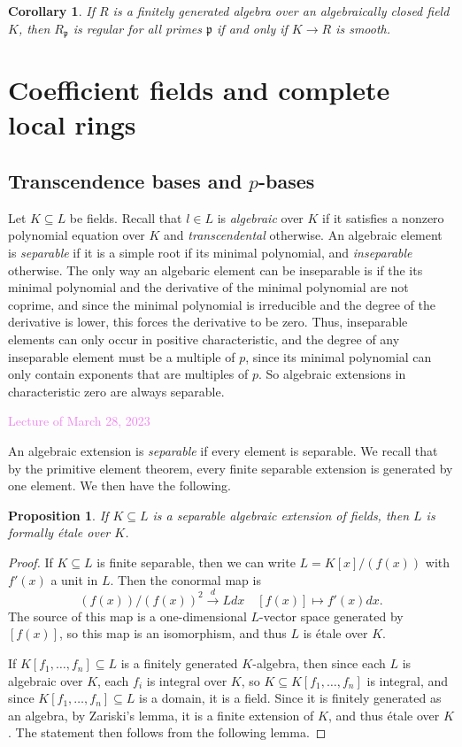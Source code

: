 \documentclass{amsart}[12pt]
\newcommand{\Mar}[1]{\textcolor{violet}{Lecture of March #1, 2023}}
\newcommand{\fp}{{\mathfrak p}}
\numberwithin{equation}{section}
\theoremstyle{plain} %
\newtheorem{cor}[equation]{Corollary}
\newtheorem{prop}[equation]{Proposition}
\theoremstyle{definition}
\theoremstyle{remark}
\newcommand{\xra}[1]{\xrightarrow{#1}}
\begin{document}
\begin{cor} If $R$ is a finitely generated algebra over an algebraically closed field $K$, then $R_\fp$ is regular for all primes $\fp$ if and only if $K\to R$ is smooth.
\end{cor}

\section{Coefficient fields and complete local rings}

\subsection{Transcendence bases and $p$-bases}

Let $K\subseteq L$ be fields. Recall that $l\in L$ is \emph{algebraic} over $K$ if it satisfies a nonzero polynomial equation over $K$ and \emph{transcendental} otherwise. An algebraic element is \emph{separable} if it is a simple root if its minimal polynomial, and \emph{inseparable} otherwise. The only way an algebaric element can be inseparable is if the  its minimal polynomial and the derivative of the minimal polynomial are not coprime, and since the minimal polynomial is irreducible and the degree of the derivative is lower, this forces the derivative to be zero. Thus, inseparable elements can only occur in positive characteristic, and the degree of any inseparable element must be a multiple of $p$, since its minimal polynomial can only contain exponents that are multiples of $p$. So algebraic extensions in characteristic zero are always separable.

\Mar{28}

An algebraic extension is \emph{separable} if every element is separable. We recall that by the primitive element theorem, every finite separable extension is generated by one element. We then have the following.

\begin{prop} If $K\subseteq L$ is a separable algebraic extension of fields, then $L$ is formally \'etale over $K$.
\end{prop}
\begin{proof}
If $K\subseteq L$ is finite separable, then we can write
$L=K[x]/(f(x))$ with $f'(x)$ a unit in $L$. Then the conormal map is
\[ (f(x))/(f(x))^2 \xra{d} L dx\quad [f(x)] \mapsto f'(x) dx. \]
The source of this map is a one-dimensional $L$-vector space generated by $[f(x)]$, so this map is an isomorphism, and thus $L$ is \'etale over $K$.

If $K[f_1,\dots,f_n]\subseteq L$ is a finitely generated $K$-algebra, then since each $L$ is algebraic over $K$, each $f_i$ is integral over $K$, so $K\subseteq K[f_1,\dots,f_n]$ is integral, and since $K[f_1,\dots,f_n]\subseteq L$ is a domain, it is a field. Since it is finitely generated as an algebra, by Zariski's lemma, it is a finite extension of $K$, and thus \'etale over $K$. The statement then follows from the following lemma.
\end{proof}
\end{document}
